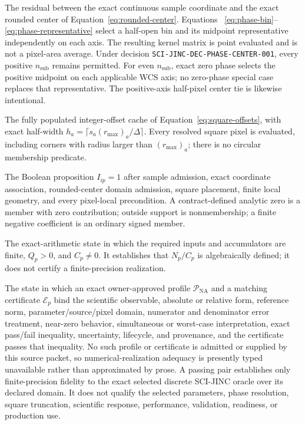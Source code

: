 \begin{description}[style=nextline,leftmargin=0pt,labelindent=0pt]
\item[Point phase.]
The residual between the exact continuous sample coordinate and the exact
rounded center of Equation~\eqref{eq:rounded-center}.  Equations~
\eqref{eq:phase-bin}--\eqref{eq:phase-representative} select a half-open bin
and its midpoint representative independently on each axis.  The resulting
kernel matrix is point evaluated and is not a pixel-area average.
Under decision \texttt{SCI-JINC-DEC-PHASE-CENTER-001}, every positive
$n_{\mathrm{sub}}$ remains permitted.  For even $n_{\mathrm{sub}}$, exact
zero phase selects the positive midpoint on each applicable WCS axis; no
zero-phase special case replaces that representative.  The positive-axis
half-pixel center tie is likewise intentional.

\item[Square support.]
The fully populated integer-offset cache of Equation~\eqref{eq:square-offsets},
with exact half-width
$h_a=\lceil s_a(r_{\max})_a/\Delta\rceil$.  Every resolved square pixel is
evaluated, including corners with radius larger than $(r_{\max})_a$; there is
no circular membership predicate.

\item[Sample-pixel membership.]
The Boolean proposition $I_{ip}=1$ after sample admission, exact coordinate
association, rounded-center domain admission, square placement, finite local
geometry, and every pixel-local precondition.  A contract-defined analytic
zero is a member with zero contribution; outside support is nonmembership; a
finite negative coefficient is an ordinary signed member.

\item[Algebraic local support.]
The exact-arithmetic state in which the required inputs and accumulators are
finite, $Q_p>0$, and $C_p\ne0$.  It establishes that $N_p/C_p$ is
algebraically defined; it does not certify a finite-precision realization.

\item[Certified numerical-realization adequacy.]
The state in which an exact owner-approved profile
$\mathcal{P}_{\mathrm{NA}}$ and a matching certificate $\mathcal{E}_p$ bind
the scientific observable, absolute or relative form, reference norm,
parameter/source/pixel domain, numerator and denominator error treatment,
near-zero behavior, simultaneous or worst-case interpretation, exact
pass/fail inequality, uncertainty, lifecycle, and provenance, and the
certificate passes that inequality.  No such profile or certificate is
admitted or supplied by this source packet, so numerical-realization adequacy
is presently typed unavailable rather than approximated by prose.
A passing pair establishes only finite-precision fidelity to the exact
selected discrete SCI-JINC oracle over its declared domain.  It does not
qualify the selected parameters, phase resolution, square truncation,
scientific response, performance, validation, readiness, or production use.


\end{description}
